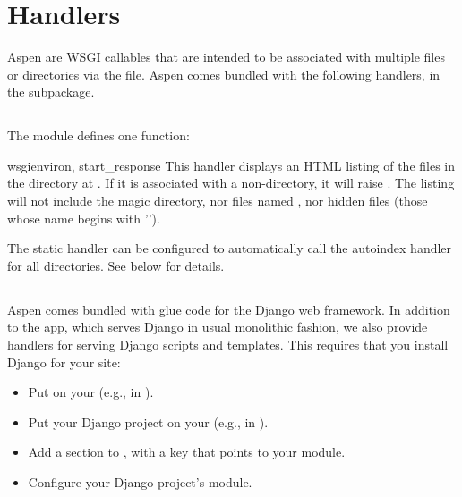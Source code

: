 \section{Handlers}
\label {api-handlers}

Aspen  are WSGI callables that are intended to be associated with
multiple files or directories via the  file. Aspen comes
bundled with the following handlers, in the  subpackage.


\subsection{}
\label{api-handlers-http}

The  module defines one function:

\begin{funcdesc}{wsgi}{environ, start_response} This handler displays an HTML
listing of the files in the directory at . If
it is associated with a non-directory, it will raise . The
listing will not include the magic directory, nor files named
, nor hidden files (those whose name begins with '').
\end{funcdesc}

The static handler can be configured to automatically call the autoindex handler
for all directories. See below for details.


\subsection{}
\label{api-handlers-django}

Aspen comes bundled with glue code for the Django web framework. In addition to
the  app, which serves Django in usual monolithic
fashion, we also provide handlers for serving Django scripts and templates. This
requires that you install Django for your site:

\begin{itemize}
\item{Put  on your  (e.g., in ).}
\item{Put your Django project on your  (e.g., in ).}
\item{Add a \code{[django]} section to , with a  key that points to your  module.}
\item{Configure your Django project's  module.}
\end{itemize}

